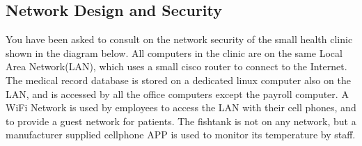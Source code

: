 \documentclass[9pt, addpoints]{exam}
\begin{document}
\begin{questions}
\newpage
\section*{Network Design and Security}
\question
You have been asked to consult on the network security of the small health
clinic shown in the diagram below. All computers in the clinic are on the
same Local Area Network(LAN), which uses a small cisco router to connect
to the Internet. The medical record database is stored on a dedicated linux computer
also on the LAN, and is accessed by all the office computers except the payroll
computer. A WiFi Network is used by employees to access the LAN
with their cell phones, and to provide a guest network for patients. The fishtank
is not on any network, but a manufacturer supplied cellphone APP is used to
monitor its temperature by staff.


\end{questions}
\end{document}
